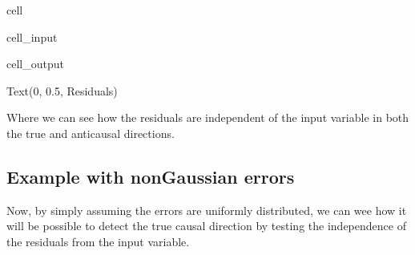 \documentclass[letterpaper,10pt,english]{jupyterBook}
\begin{document}
\begin{sphinxuseclass}{cell}
\begin{sphinxVerbatimInput}
\begin{sphinxuseclass}{cell_input}
\begin{sphinxVerbatim}[commandchars=\\\{\}]
  \PYG{p}{[}\PYG{p}{]}    
\PYG{p}{[}\PYG{p}{]}
\PYG{p}{[}\PYG{p}{]}
\PYG{p}{[}\PYG{p}{]}
\end{sphinxVerbatim}

\end{sphinxuseclass}\end{sphinxVerbatimInput}
\begin{sphinxVerbatimOutput}

\begin{sphinxuseclass}{cell_output}
\begin{sphinxVerbatim}[commandchars=\\\{\}]
Text(0, 0.5, \PYGZsq{}Residuals\PYGZsq{})
\end{sphinxVerbatim}

\noindent{}

\end{sphinxuseclass}\end{sphinxVerbatimOutput}

\end{sphinxuseclass}
\sphinxAtStartPar
Where we can see how the residuals are independent of the input variable in both the true and anti\sphinxhyphen{}causal directions.


\subsection{Example with non\sphinxhyphen{}Gaussian errors}
\label{\detokenize{notebooks/semiparametric_direct_lingam:example-with-non-gaussian-errors}}
\sphinxAtStartPar
Now, by simply assuming the errors are uniformly distributed, we can wee how it will be possible to detect the true causal direction by testing the independence of the residuals from the input variable.
\end{document}
